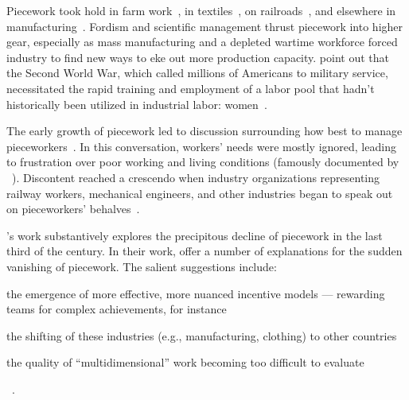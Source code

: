 \documentclass[trackingWork]{subfiles}
\begin{document}
Piecework took hold in farm work~\cite{hughRaynbirdTaskWork},
in textiles~\cite{restructuringPieceworkBaker,riisOtherSideLives},
on railroads~\cite{Brown01041990}, and 
elsewhere in manufacturing~\cite{10.2307/3827491}.
Fordism and scientific management thrust piecework into higher gear, especially as
mass manufacturing and
a depleted wartime workforce forced industry to find new ways to eke out more production capacity.
\citeauthor{hart2013rise} point out that the Second World War,
which called millions of Americans to military service,
necessitated the rapid training and employment of
a labor pool that hadn't historically been utilized in industrial labor: women~\cite{hart2013rise}.

The early growth of piecework led to discussion surrounding how best to manage pieceworkers~\cite{norton1900textile,clark1908cotton}.
In this conversation, workers' needs were mostly ignored,
leading to frustration over poor working and living conditions
(famously documented by
\citeauthor{riisOtherSideLives}~\cite{riisOtherSideLives}).
Discontent reached a crescendo when industry organizations representing
railway workers, mechanical engineers, and other industries began to speak out on pieceworkers' behalves~\cite{american1921problem,richards1904anything}.

\citeauthor{hart2013rise}'s work substantively explores the precipitous decline of piecework in the last third of the  century.
In their work, \citeauthor{hart2013rise} offer a number of explanations for the sudden vanishing of piecework.
The salient suggestions include:
\begin{inlinelist}[itemjoin*={;~and~},itemjoin={;~}]
\item the emergence of more effective, more nuanced incentive models
--- rewarding teams for complex achievements, for instance
\item the shifting of these industries (e.g., manufacturing, clothing)
to other countries
\item the quality of ``multidimensional'' work becoming too difficult to evaluate
\end{inlinelist}~\cite{hart2013rise}.
\end{document}
